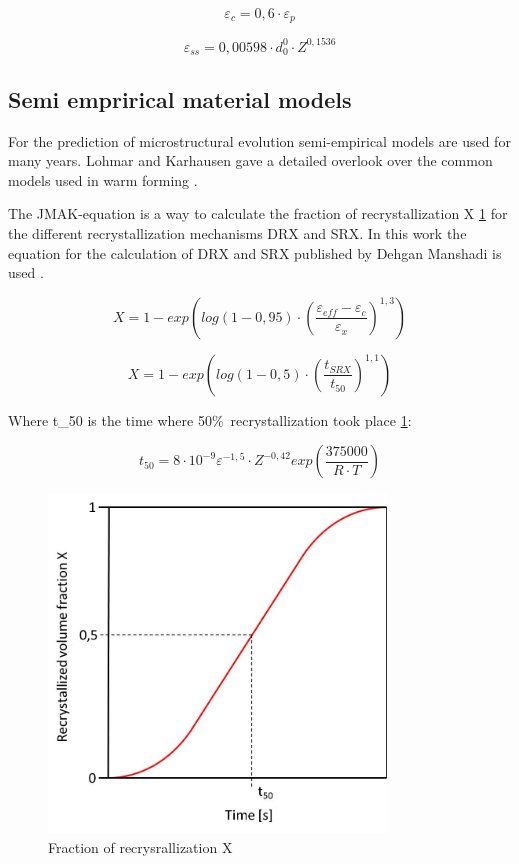 \begin{equation}
 \varepsilon_{c} = 0,6\cdot\varepsilon_{p}
\end{equation}

\begin{equation}
 \varepsilon_{ss} = 0,00598\cdot d_{0}^{0}\cdot Z^{0,1536}
\end{equation}

\subsection{Semi emprirical material models}
For the prediction of microstructural evolution semi-empirical models are used for many years. Lohmar and Karhausen gave a detailed overlook over the common models used in warm forming \cite{LOH10}\cite{KAR94}.\par 

The JMAK-equation is a way to calculate the fraction of recrystallization X \ref{img:JMAK} for the different recrystallization mechanisms DRX and SRX. In this work the equation for the calculation of DRX and SRX published by Dehgan Manshadi is used \cite{DEH08}.

\begin{equation}
 X = 1 - exp\left( log\left( 1-0,95\right) \cdot\left( \frac{\varepsilon_{eff}-\varepsilon_{c}}{\varepsilon_{x}}\right) ^{1,3}\right)
\end{equation}

\begin{equation}
 X = 1 - exp\left( log\left( 1-0,5\right) \cdot\left( \frac{t_{SRX}}{t_{50}}\right) ^{1,1}\right)
\end{equation}

Where t_{50} is the time where 50\%\ recrystallization took place \ref{img:JMAK}:

\begin{equation}
 t_{50} = 8\cdot10^{-9}\varepsilon^{-1,5}\cdot Z^{-0,42}exp\left( \frac{375000}{R\cdot T}\right)
\end{equation}

\begin{figure}[htbp]
 \centering
 \includegraphics[width=0.8\textwidth]{images/JMAK}
 \caption{Fraction of recrysrallization X}
 \label{img:JMAK}
\end{figure}

